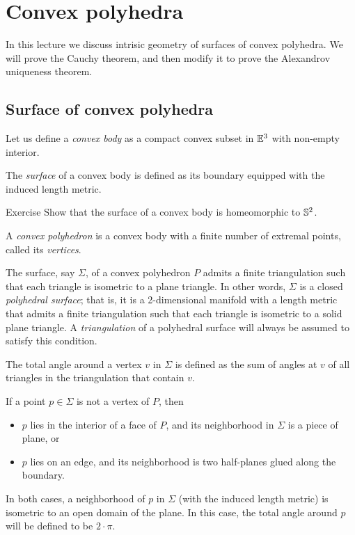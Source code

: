 \chapter{Convex polyhedra}\label{chap:alex-embedding}

In this lecture we discuss intrisic geometry of surfaces of convex polyhedra.
We will prove the Cauchy theorem, and then modify it to prove the Alexandrov uniqueness theorem.

\section{Surface of convex polyhedra}

Let us define a \emph{convex body} as a compact convex subset in $\mathbb{E}^3$ with non-empty interior.

The \emph{surface} of a convex body is defined as its boundary equipped with the induced length metric.

\begin{thm}{Exercise}\label{ex:surf-S2}
Show that the surface of a convex body is homeomorphic to $\mathbb{S}^2$.
\end{thm}

A \emph{convex polyhedron} is a convex body with a finite number of extremal points, called its \emph{vertices}.

The surface, say $\Sigma$, of a convex polyhedron $P$ admits a finite triangulation such that each triangle is isometric to a plane triangle.
In other words, $\Sigma$ is a closed \emph{polyhedral surface};
that is, it is a 2-dimensional manifold with a length metric that admits a finite triangulation such that each triangle is isometric to a solid plane triangle.
A \emph{triangulation} of a polyhedral surface will always be assumed to satisfy this condition.

The total angle around a vertex $v$ in $\Sigma$ is defined as the sum of angles at $v$ of all triangles in the triangulation that contain $v$.

If a point $p\in \Sigma$ is not a vertex of $P$,
then
\begin{itemize}
\item $p$ lies in the interior of a face of $P$, and its neighborhood in $\Sigma$ is a piece of plane, or
\item $p$ lies on an edge, and its neighborhood is two half-planes glued along the boundary.
\end{itemize}
In both cases, a neighborhood of $p$ in $\Sigma$ (with the induced length metric) is isometric to an open domain of the plane.
In this case, the total angle around $p$ will be defined to be $2\cdot\pi$.

